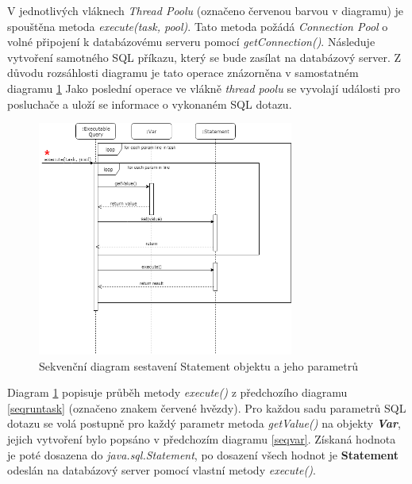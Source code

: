 \documentclass[czech,bachelor,public,dept460,male,cpdeclaration,twoside]{diploma}
\begin{document}
V jednotlivých vláknech \textit{Thread Poolu} (označeno červenou barvou v diagramu) je spouštěna metoda \textit{execute(task, pool)}. Tato metoda požádá \textit{Connection Pool} o volné připojení k databázovému serveru pomocí \textit{getConnection()}. Následuje vytvoření samotného SQL příkazu, který se bude zasílat na databázový server. Z důvodu rozsáhlosti diagramu je tato operace znázorněna v samostatném diagramu \ref{getvalues} Jako poslední operace ve vlákně \textit{thread poolu} se vyvolají události pro posluchače a uloží se informace o vykonaném SQL dotazu.


\begin{figure}[!htbp]\centering\includegraphics[width=0.75\textwidth]{Figures/getvalues.png}\caption{Sekvenční diagram sestavení Statement objektu a jeho parametrů}
\label{getvalues}
\end{figure}

Diagram \ref{getvalues} popisuje průběh metody \textit{execute()} z předchozího diagramu \ref{seqruntask} (označeno znakem červené hvězdy). Pro každou sadu parametrů SQL dotazu se volá postupně pro každý parametr metoda \textit{getValue()} na objekty \textbf{\emph{Var}}, jejich vytvoření bylo popsáno v předchozím diagramu \ref{seqvar}. Získaná hodnota je poté dosazena do \textit{java.sql.Statement}, po dosazení všech hodnot je \textbf{Statement} odeslán na databázový server pomocí vlastní metody \textit{execute()}.

\newpage
\end{document}
